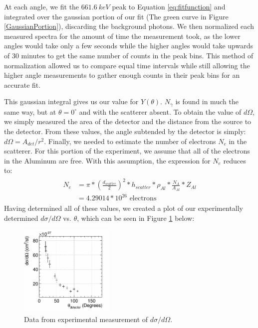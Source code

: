 \documentclass[%
 reprint,
 amsmath,amssymb,
 aps,
 pra,
]{revtex4-1}
\begin{document}
At each angle, we fit the $661.6~keV$ peak to Equation \ref{eq:fitfunction} and integrated over the gaussian portion of our fit (The green curve in Figure \ref{GaussianPortion}), discarding the background photons. We then normalized each measured spectra for the amount of time the measurement took, as the lower angles would take only a few seconds while the higher angles would take upwards of 30 minutes to get the same number of counts in the peak bins. This method of normalization allowed us to compare equal time intervals while still allowing the higher angle measurements to gather enough counts in their peak bins for an accurate fit.

This gaussian integral gives us our value for $Y(\theta)$. $N_\gamma$ is found in much the same way, but at $\theta = 0^\circ$ and with the scatterer absent. To obtain the value of $d\Omega$, we simply measured the area of the detector and the distance from the source to the detector. From these values, the angle subtended by the detector is simply: $d\Omega = A_{det}/r^2$. Finally, we needed to estimate the number of electrons $N_e$ in the scatterer. For this portion of the experiment, we assume that all of the electrons in the Aluminum are free. With this assumption, the expression for $N_e$ reduces to:
\begin{gather}
	\begin{split}
		N_e 		& = \pi*\left(\frac{d_{scatter}}{2}\right)^2*h_{scatter}*\rho_{Al}*\frac{N_A}{A_{Al}}*Z_{Al} \\
				& = 4.29014*10^{26} \text{ electrons}
	\end{split} \nonumber
\end{gather}
\noindent Having determined all of these values, we created a plot of our experimentally determined $d\sigma / d\Omega$ vs. $\theta$, which can be seen in Figure \ref{KN} below:

\begin{figure}[H]
	\centering
	\includegraphics[width=0.4\textwidth]{KNvsThompson_DataOnly.png}
	\caption{Data from experimental measurement of $d\sigma/d\Omega$.}
	\label{KN}
\end{figure}
\end{document}
